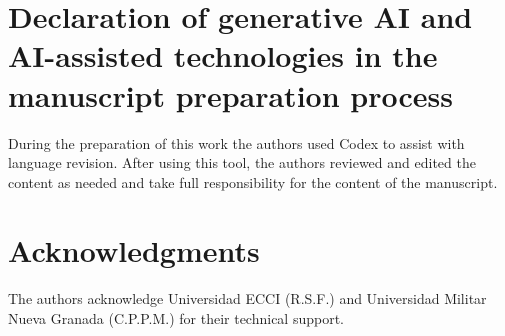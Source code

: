 \documentclass[review,authoryear,longtitle]{elsarticle}
\begin{document}
\section*{Declaration of generative AI and AI-assisted technologies in the manuscript preparation process}
During the preparation of this work the authors used Codex to assist with language revision. After using this tool, the authors reviewed and edited the content as needed and take full responsibility for the content of the manuscript.

\section*{Acknowledgments}
The authors acknowledge Universidad ECCI (R.S.F.) and Universidad Militar Nueva Granada (C.P.P.M.) for their technical support.



\end{document}

